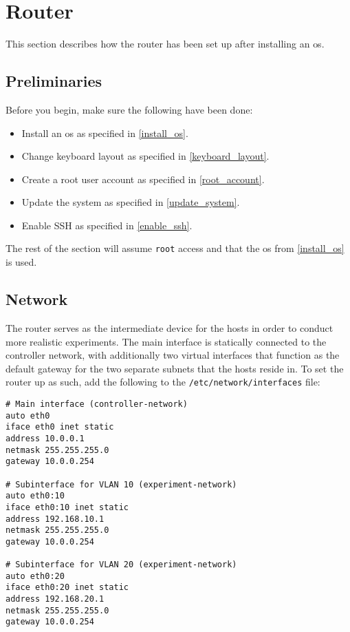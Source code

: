 \chapter{Router}

This section describes how the router has been set up after installing an \gls{os}.

\section{Preliminaries}

Before you begin, make sure the following have been done:

\begin{itemize}
    \item Install an \gls{os} as specified in \ref{install_os}.
    \item Change keyboard layout as specified in \ref{keyboard_layout}.
    \item Create a root user account as specified in \ref{root_account}.
    \item Update the system as specified in \ref{update_system}.
    \item Enable SSH as specified in \ref{enable_ssh}.
\end{itemize}

The rest of the section will assume \lstinline{root} access and that the \gls{os} from \ref{install_os} is used.


\section{Network}

The router serves as the intermediate device for the hosts in order to conduct more realistic experiments. The main interface is statically connected to the controller network, with additionally two virtual interfaces that function as the default gateway for the two separate subnets that the hosts reside in. To set the router up as such, add the following to the \lstinline{/etc/network/interfaces} file:

\begin{lstlisting}
# Main interface (controller-network)
auto eth0
iface eth0 inet static
address 10.0.0.1
netmask 255.255.255.0
gateway 10.0.0.254

# Subinterface for VLAN 10 (experiment-network)
auto eth0:10
iface eth0:10 inet static
address 192.168.10.1
netmask 255.255.255.0
gateway 10.0.0.254

# Subinterface for VLAN 20 (experiment-network)
auto eth0:20
iface eth0:20 inet static
address 192.168.20.1
netmask 255.255.255.0
gateway 10.0.0.254
\end{lstlisting}

